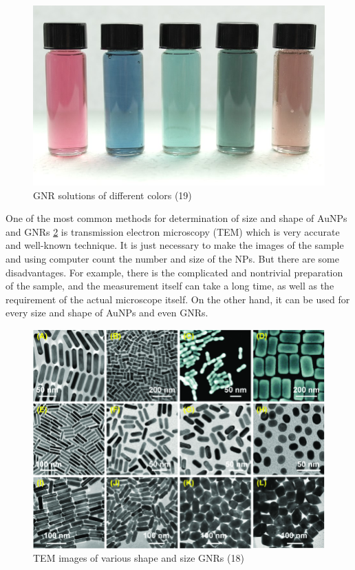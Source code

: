 \documentclass[a4paper,12pt]{article}   %
\numberwithin{equation}{section}        %
\begin{document}
        \begin{figure}[h]
            \includegraphics[width=\linewidth]{color.png}
            \caption{GNR solutions of different colors (19)}
            \label{fig:color}
        \end{figure}

        One of the most common methods for determination of size and shape of AuNPs and GNRs \ref{fig:GNR_shape} is transmission electron microscopy (TEM) which is very accurate and well-known technique.
        It is just necessary to make the images of the sample and using computer count the number and size of the NPs. But there are some disadvantages. For example,
        there is the complicated and nontrivial preparation of the sample, and the measurement itself can take a long time, as well as the requirement of the actual microscope itself.
        On the other hand, it can be used for every size and shape of AuNPs and even GNRs.

        \begin{figure}[h]
            \includegraphics[width=\linewidth]{GNRs_shapes.png}
            \caption{TEM images of various shape and size GNRs (18)}
            \label{fig:GNR_shape}
        \end{figure}
\end{document}
